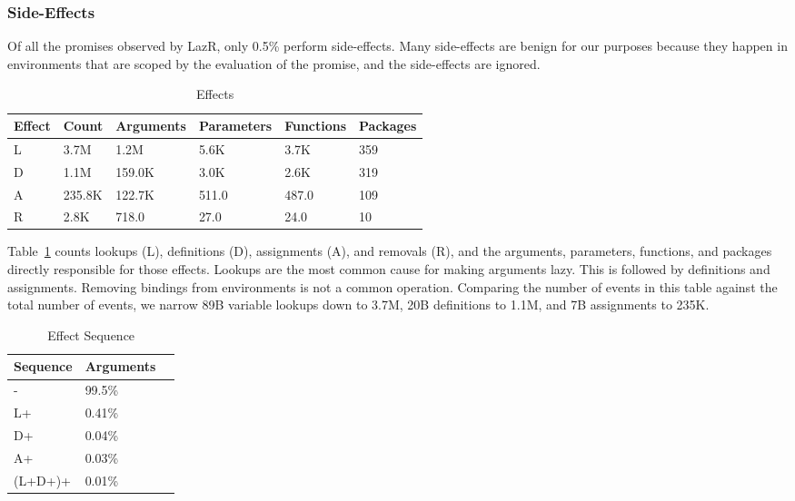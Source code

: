 \documentclass[review,creen,acmsmall]{acmart}
\newcommand{\lazr}{{\sf LazR}\xspace}
\begin{document}
\subsubsection{Side-Effects}

Of all the promises observed by \lazr, only 0.5\% perform side-effects. Many
side-effects are benign for our purposes because they happen in environments
that are scoped by the evaluation of the promise, and the side-effects are ignored.

\begin{table}[!h]  \vspace{-3mm}  \small
  \caption{Effects} \label{table:effects} \centering
  \begin{tabular}{llllll}    \toprule
    \textbf{Effect}&\textbf{Count}&\textbf{Arguments}&\textbf{Parameters}&\textbf{Functions}&\textbf{Packages}\\    \midrule
    L&3.7M&1.2M&5.6K&3.7K&359\\
    D&1.1M&159.0K&3.0K&2.6K&319\\
    A&235.8K&122.7K&511.0&487.0&109\\
    R&2.8K&718.0&27.0&24.0&10\\    \bottomrule
  \end{tabular}
\end{table}

\noindent
Table~\ref{table:effects} counts lookups (L), definitions (D), assignments (A),
and removals (R), and the arguments, parameters, functions, and packages directly
responsible for those effects. Lookups are the most common cause for making
arguments lazy. This is followed by definitions and assignments. Removing
bindings from environments is not a common operation.
%
Comparing the number of events in this table against the total number of events,
we narrow 89B variable lookups down to 3.7M, 20B definitions to 1.1M, and 7B
assignments to 235K.

\begin{wraptable}{r}{5cm}
  \vspace{-3mm}
  \small
  \caption{Effect Sequence} \label{table:effectseq}
  \centering
  \begin{tabular}{lll}
    \toprule
    \textbf{Sequence}&\textbf{Arguments}\\
    \midrule
    -&99.5\%\\
    L+&0.41\%\\
    D+&0.04\%\\
    A+&0.03\%\\
    (L+D+)+&0.01\%\\
    \bottomrule
  \end{tabular}
\end{wraptable}
\end{document}
